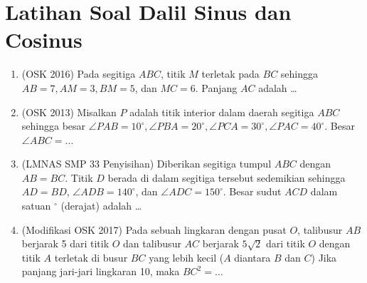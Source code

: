 \documentclass[12pt]{scrartcl}
\begin{document}
\section{Latihan Soal Dalil Sinus dan Cosinus}
\begin{enumerate}
    \item (OSK 2016) Pada segitiga $ABC$, titik $M$ terletak pada $BC$ sehingga $AB=7, AM=3, BM=5$, dan $MC=6$. Panjang $AC$ adalah \dots

    \item (OSK 2013) Misalkan $P$ adalah titik interior dalam daerah segitiga $ABC$ sehingga besar $\angle PAB = 10^\circ, \angle PBA = 20^\circ, \angle PCA = 30^\circ, \angle PAC=40^\circ$. Besar $\angle ABC = \dots$
    
    \item (LMNAS SMP 33 Penyisihan) Diberikan segitiga tumpul $ABC$ dengan $AB = BC$. Titik $D$ berada di dalam segitiga tersebut sedemikian sehingga $AD = BD$, $\angle ADB = 140^\circ$, dan $\angle ADC = 150^\circ$. Besar sudut $ACD$ dalam satuan $^\circ$ (derajat) adalah \dots
    
    \item (Modifikasi OSK 2017) Pada sebuah lingkaran dengan pusat $O$, talibusur $AB$ berjarak 5 dari titik $O$ dan talibusur $AC$ berjarak $5\sqrt{2}$ dari titik $O$ dengan titik $A$ terletak di busur $BC$ yang lebih kecil ($A$ diantara $B$ dan $C$) Jika panjang jari-jari lingkaran 10, maka $BC^2=\dots$
\end{enumerate}
\end{document}
